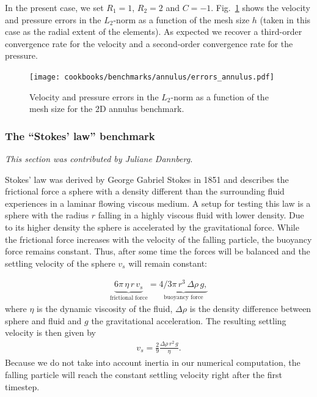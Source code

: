 \documentclass{article}
\begin{document}
In the present case, we set $R_1=1$, $R_2=2$ and $C=-1$. Fig.~\ref{fig:annulus-errors} shows the
velocity and pressure errors in the $L_2$-norm as a function of the mesh size $h$ (taken in this case
as the radial extent of the elements). As expected we recover a third-order convergence rate for the velocity
and a second-order convergence rate for the pressure.

\begin{figure}
\centering
\texttt{[image: cookbooks/benchmarks/annulus/errors\_annulus.pdf]}
\caption{Velocity and pressure errors in the $L_2$-norm as a function of the mesh size for the 2D annulus benchmark.}
\label{fig:annulus-errors}
\end{figure}

\subsubsection{The ``Stokes' law'' benchmark}
\label{sec:benchmark-stokes_law}

\textit{This section was contributed by Juliane Dannberg.}

Stokes' law was derived by George Gabriel Stokes in 1851 and describes the frictional force
a sphere with a density different than the surrounding fluid experiences in a
laminar flowing viscous medium.
A setup for testing this law is a sphere with the radius $r$ falling in a highly
viscous fluid with lower density. Due to its higher density the sphere is
accelerated by the gravitational force. While
the frictional force increases with the velocity of the falling particle,
the buoyancy force remains constant. Thus, after some time the forces will
be balanced and the settling velocity of the sphere $v_s$ will remain constant:

\begin{align}
  \label{eq:stokes-law}
  \underbrace{6 \pi \, \eta \, r \, v_s}_{\text{frictional force}} =
  \underbrace{4/3 \pi \, r^3 \, \Delta\rho \, g,}_{\text{buoyancy force}}
\end{align}
where $\eta$ is the dynamic viscosity of the fluid, $\Delta\rho$ is the
density difference between sphere and fluid and $g$ the gravitational
acceleration. The resulting settling velocity is then given by
\begin{align}
  \label{eq:stokes-velo}
  v_s = \frac{2}{9} \frac{\Delta\rho \, r^2 \, g}{\eta}.
\end{align}
Because we do not take into account inertia in our numerical computation,
the falling particle will reach the constant settling velocity right after
the first timestep.
\end{document}
